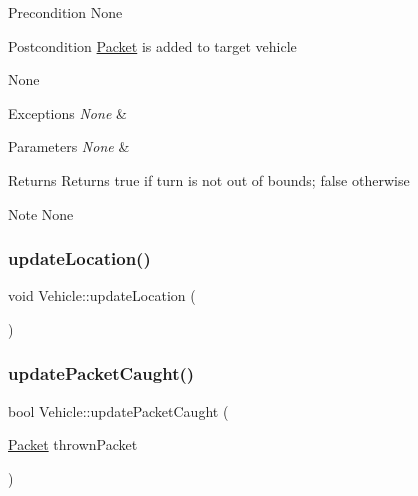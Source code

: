 \begin{DoxyPrecond}{Precondition}
None
\end{DoxyPrecond}
\begin{DoxyPostcond}{Postcondition}
\hyperlink{struct_packet}{Packet} is added to target vehicle
\end{DoxyPostcond}
\begin{DoxyParagraph}{None}

\end{DoxyParagraph}

\begin{DoxyExceptions}{Exceptions}
{\em None} & \\
\hline
\end{DoxyExceptions}

\begin{DoxyParams}{Parameters}
{\em None} & \\
\hline
\end{DoxyParams}
\begin{DoxyReturn}{Returns}
Returns true if turn is not out of bounds; false otherwise
\end{DoxyReturn}
\begin{DoxyNote}{Note}
None 
\end{DoxyNote}
\hypertarget{class_vehicle_a6c88cbaee4264ac164f81136994a623e}{}\label{class_vehicle_a6c88cbaee4264ac164f81136994a623e} 
\subsubsection{\texorpdfstring{update\+Location()}{updateLocation()}}
{\footnotesize\ttfamily void Vehicle\+::update\+Location (\begin{DoxyParamCaption}{ }\end{DoxyParamCaption})}

\hypertarget{class_vehicle_a66ae172bfcd9d1f691bc9a32e4e7cc71}{}\label{class_vehicle_a66ae172bfcd9d1f691bc9a32e4e7cc71} 
\subsubsection{\texorpdfstring{update\+Packet\+Caught()}{updatePacketCaught()}}
{\footnotesize\ttfamily bool Vehicle\+::update\+Packet\+Caught (\begin{DoxyParamCaption}\item[{\hyperlink{struct_packet}{Packet}}]{thrown\+Packet }\end{DoxyParamCaption})}



